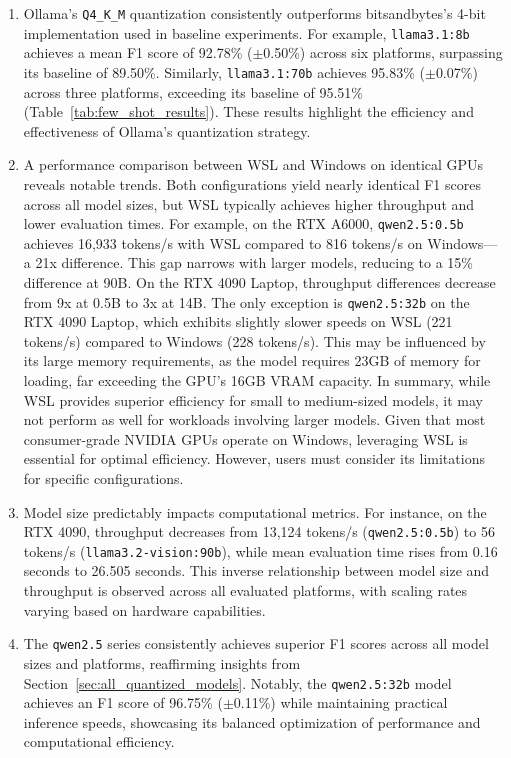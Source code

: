 \documentclass[conference]{IEEEtran}
\begin{document}
\begin{enumerate}
    \item Ollama's \texttt{Q4\_K\_M} quantization consistently outperforms bitsandbytes's 4-bit implementation used in baseline experiments. For example, \texttt{llama3.1:8b} achieves a mean F1 score of 92.78\% ($\pm$0.50\%) across six platforms, surpassing its baseline of 89.50\%. Similarly, \texttt{llama3.1:70b} achieves 95.83\% ($\pm$0.07\%) across three platforms, exceeding its baseline of 95.51\% (Table~\ref{tab:few_shot_results}). These results highlight the efficiency and effectiveness of Ollama's quantization strategy.

    \item A performance comparison between WSL and Windows on identical GPUs reveals notable trends. Both configurations yield nearly identical F1 scores across all model sizes, but WSL typically achieves higher throughput and lower evaluation times. For example, on the RTX A6000, \texttt{qwen2.5:0.5b} achieves 16,933 tokens/s with WSL compared to 816 tokens/s on Windows—a 21x difference. This gap narrows with larger models, reducing to a 15\% difference at 90B. On the RTX 4090 Laptop, throughput differences decrease from 9x at 0.5B to 3x at 14B. 
    The only exception is \texttt{qwen2.5:32b} on the RTX 4090 Laptop, which exhibits slightly slower speeds on WSL (221 tokens/s) compared to Windows (228 tokens/s). This may be influenced by its large memory requirements, as the model requires 23GB of memory for loading, far exceeding the GPU's 16GB VRAM capacity. 
    In summary, while WSL provides superior efficiency for small to medium-sized models, it may not perform as well for workloads involving larger models. Given that most consumer-grade NVIDIA GPUs operate on Windows, leveraging WSL is essential for optimal efficiency. However, users must consider its limitations for specific configurations.
    
    \item Model size predictably impacts computational metrics. For instance, on the RTX 4090, throughput decreases from 13,124 tokens/s (\texttt{qwen2.5:0.5b}) to 56 tokens/s (\texttt{llama3.2-vision:90b}), while mean evaluation time rises from 0.16 seconds to 26.505 seconds. This inverse relationship between model size and throughput is observed across all evaluated platforms, with scaling rates varying based on hardware capabilities.

    \item The \texttt{qwen2.5} series consistently achieves superior F1 scores across all model sizes and platforms, reaffirming insights from Section~\ref{sec:all_quantized_models}. Notably, the \texttt{qwen2.5:32b} model achieves an F1 score of 96.75\% ($\pm$0.11\%) while maintaining practical inference speeds, showcasing its balanced optimization of performance and computational efficiency.
\end{enumerate}
\end{document}
